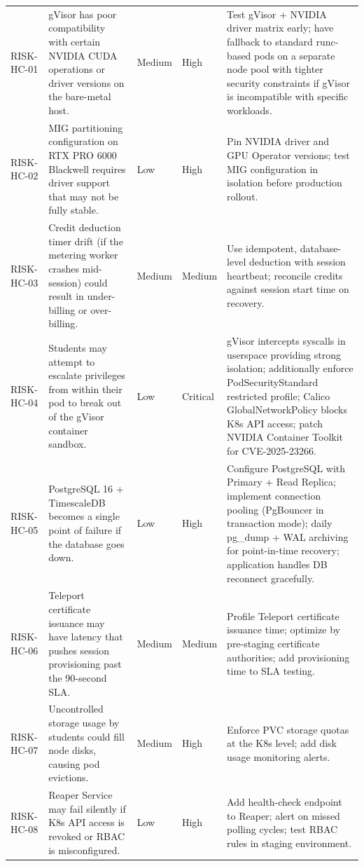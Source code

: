 \documentclass[12pt,a4paper]{article}
\begin{document}
\begin{longtable}{@{}L{2cm}L{4.5cm}L{1.5cm}L{1.5cm}L{5cm}@{}}
  RISK-HC-01 & gVisor has poor compatibility with certain NVIDIA CUDA operations or driver versions on the bare-metal host. & Medium & High & Test gVisor + NVIDIA driver matrix early; have fallback to standard runc-based pods on a separate node pool with tighter security constraints if gVisor is incompatible with specific workloads. \\
    RISK-HC-02 & MIG partitioning configuration on RTX PRO 6000 Blackwell requires driver support that may not be fully stable. & Low & High & Pin NVIDIA driver and GPU Operator versions; test MIG configuration in isolation before production rollout. \\
  RISK-HC-03 & Credit deduction timer drift (if the metering worker crashes mid-session) could result in under-billing or over-billing. & Medium & Medium & Use idempotent, database-level deduction with session heartbeat; reconcile credits against session start time on recovery. \\
    RISK-HC-04 & Students may attempt to escalate privileges from within their pod to break out of the gVisor container sandbox. & Low & Critical & gVisor intercepts syscalls in userspace providing strong isolation; additionally enforce PodSecurityStandard restricted profile; Calico GlobalNetworkPolicy blocks K8s API access; patch NVIDIA Container Toolkit for CVE-2025-23266. \\
  RISK-HC-05 & PostgreSQL 16 + TimescaleDB becomes a single point of failure if the database goes down. & Low & High & Configure PostgreSQL with Primary + Read Replica; implement connection pooling (PgBouncer in transaction mode); daily pg\_dump + WAL archiving for point-in-time recovery; application handles DB reconnect gracefully. \\
    RISK-HC-06 & Teleport certificate issuance may have latency that pushes session provisioning past the 90-second SLA. & Medium & Medium & Profile Teleport certificate issuance time; optimize by pre-staging certificate authorities; add provisioning time to SLA testing. \\
  RISK-HC-07 & Uncontrolled storage usage by students could fill node disks, causing pod evictions. & Medium & High & Enforce PVC storage quotas at the K8s level; add disk usage monitoring alerts. \\
    RISK-HC-08 & Reaper Service may fail silently if K8s API access is revoked or RBAC is misconfigured. & Low & High & Add health-check endpoint to Reaper; alert on missed polling cycles; test RBAC rules in staging environment. \\

\end{longtable}
\end{document}
